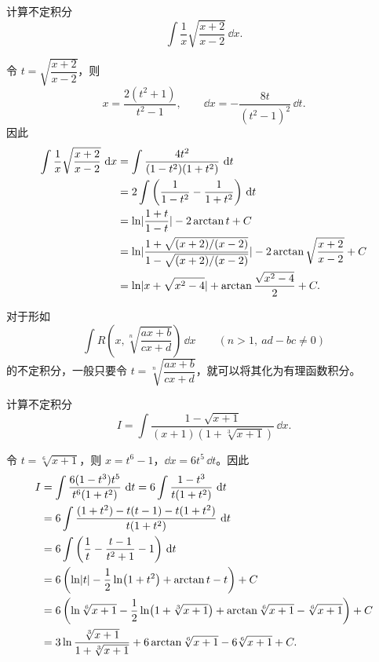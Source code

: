 \begin{xexample}[9.2.7]
计算不定积分
\[
  \int\frac1x\sqrt{\frac{x+2}{x-2}}\,\dd x.
\]
\end{xexample}

\begin{xsolution}
令 $t=\sqrt{\dfrac{x+2}{x-2}}$，则
\[
  x=\frac{2(t^2+1)}{t^2-1},
  \qquad
  \dd x=-\frac{8t}{(t^2-1)^2}\,\dd t.
\]
因此
\begin{align*}
  \int\frac1x\sqrt{\frac{x+2}{x-2}}\,\mathop{}\!\mathrm{d} x
  &=\int\frac{4t^2}{(1-t^2)(1+t^2)}\,\mathop{}\!\mathrm{d} t\\
  &=2\int\left(\frac1{1-t^2}-\frac1{1+t^2}\right)\,\mathop{}\!\mathrm{d} t\\
  &=\ln\lvert\frac{1+t}{1-t}\rvert-2\arctan t+C\\
  &=\ln\lvert\frac{1+\sqrt{(x+2)/(x-2)}}{1-\sqrt{(x+2)/(x-2)}}\rvert
    -2\arctan\sqrt{\frac{x+2}{x-2}}+C\\
  &=\ln\lvert x+\sqrt{x^2-4}\rvert+\arctan\frac{\sqrt{x^2-4}}2+C.
\end{align*}
\end{xsolution}

\begin{xremark}
对于形如
\[
  \int R\left(x,\sqrt[n]{\frac{ax+b}{cx+d}}\right)\,\dd x
  \qquad(n>1,\ ad-bc\ne0)
\]
的不定积分，一般只要令 $t=\sqrt[n]{\dfrac{ax+b}{cx+d}}$，就可以将其化为有理函数积分。
\end{xremark}

\begin{xexample}[9.2.8]
计算不定积分
\[
  I=\int\frac{1-\sqrt{x+1}}{(x+1)(1+\sqrt[3]{x+1})}\,\dd x.
\]
\end{xexample}

\begin{xsolution}
令 $t=\sqrt[6]{x+1}$，则 $x=t^6-1$，$\dd x=6t^5\,\dd t$。因此
\begin{align*}
  I
  &=\int\frac{6(1-t^3)t^5}{t^6(1+t^2)}\,\mathop{}\!\mathrm{d} t
   =6\int\frac{1-t^3}{t(1+t^2)}\,\mathop{}\!\mathrm{d} t\\
  &=6\int\frac{(1+t^2)-t(t-1)-t(1+t^2)}{t(1+t^2)}\,\mathop{}\!\mathrm{d} t\\
  &=6\int\left(\frac1t-\frac{t-1}{t^2+1}-1\right)\,\mathop{}\!\mathrm{d} t\\
  &=6\left(\ln\lvert t\rvert-\frac12\ln(1+t^2)+\arctan t-t\right)+C\\
  &=6\left(\ln\sqrt[6]{x+1}-\frac12\ln(1+\sqrt[3]{x+1})
    +\arctan\sqrt[6]{x+1}-\sqrt[6]{x+1}\right)+C\\
  &=3\ln\frac{\sqrt[3]{x+1}}{1+\sqrt[3]{x+1}}
    +6\arctan\sqrt[6]{x+1}-6\sqrt[6]{x+1}+C.
\end{align*}
\end{xsolution}

